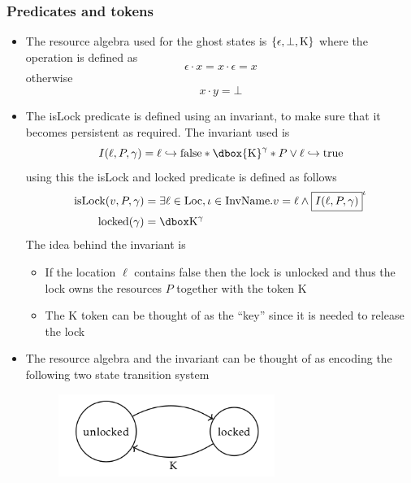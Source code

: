 \subsubsection{Predicates and tokens}
\begin{itemize}
	\item The resource algebra used for the ghost states is $\{\epsilon, \bot, \text{K}\}$ where the operation is defined as
  \[
    \epsilon \cdot x = x \cdot \epsilon = x
  \]
  otherwise 
  \[
    x \cdot y = \bot
  \]
  \item The isLock predicate is defined using an invariant, to make sure that it becomes persistent as required. The invariant used is
  \[
    I(\ell, P, \gamma) = \ell \hookrightarrow \false * \dbox{\Key}^\gamma * P \lor \ell \hookrightarrow \true
  \]
  using this the isLock and locked predicate is defined as follows
  \begin{align*}
    \text{isLock}(v,P, \gamma) &= \exists \ell \in \text{Loc}, \iota \in \text{InvName} . v = \ell \land \inv{I(\ell, P, \gamma)}^\iota \\
    \text{locked}(\gamma) &= \dboxed{\Key}^\gamma
  \end{align*}
  The idea behind the invariant is
  \begin{itemize}
  	\item If the location $\ell$ contains false then the lock is unlocked and thus the lock owns the resources $P$ together with the token K
    \item The K token can be thought of as the ``key'' since it is needed to release the lock
  \end{itemize}
  \item The resource algebra and the invariant can be thought of as encoding the following two state transition system
  \begin{figure}[H]
  	\centering
  	\includegraphics[width=200pt]{img/concurrency/transition-lock}
  \end{figure}
\end{itemize}

